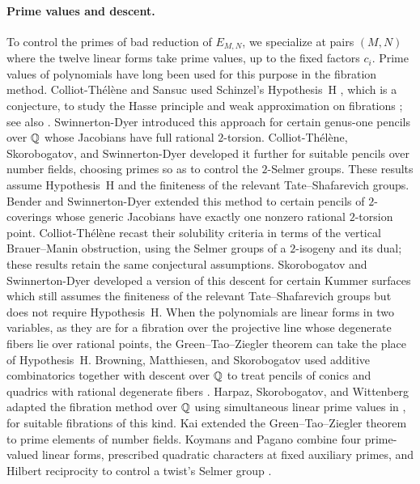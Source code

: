\paragraph{Prime values and descent.} To control the primes of bad reduction of $E_{M,N}$, we specialize at pairs $(M,N)$ where the twelve linear forms take prime values, up to the fixed factors $c_i$. Prime values of polynomials have long been used for this purpose in the fibration method. Colliot-Th\'el\`ene and Sansuc used Schinzel's Hypothesis~H \cite{SchinzelSierpinski1958}, which is a conjecture, to study the Hasse principle and weak approximation on fibrations \cite{ColliotTheleneSansuc1982}; see also \cite{ColliotTheleneSwinnertonDyer1994}. Swinnerton-Dyer \cite{SwinnertonDyer1995} introduced this approach for certain genus-one pencils over $\mathbb Q$ whose Jacobians have full rational $2$-torsion. Colliot-Th\'el\`ene, Skorobogatov, and Swinnerton-Dyer \cite[Introduction]{CSS1998GenusOne} developed it further for suitable pencils over number fields, choosing primes so as to control the $2$-Selmer groups. These results assume Hypothesis~H and the finiteness of the relevant Tate--Shafarevich groups. Bender and Swinnerton-Dyer \cite[Theorems~1--2]{BenderSwinnertonDyer2001} extended this method to certain pencils of $2$-coverings whose generic Jacobians have exactly one nonzero rational $2$-torsion point. Colliot-Th\'el\`ene \cite[Theorems~A--B and \S1.4]{ColliotThelene2001} recast their solubility criteria in terms of the vertical Brauer--Manin obstruction, using the Selmer groups of a $2$-isogeny and its dual; these results retain the same conjectural assumptions. Skorobogatov and Swinnerton-Dyer \cite{SkorobogatovSwinnertonDyer2005} developed a version of this descent for certain Kummer surfaces which still assumes the finiteness of the relevant Tate--Shafarevich groups but does not require Hypothesis~H. When the polynomials are linear forms in two variables, as they are for a fibration over the projective line whose degenerate fibers lie over rational points, the Green--Tao--Ziegler theorem can take the place of Hypothesis~H. Browning, Matthiesen, and Skorobogatov used additive combinatorics together with descent over $\mathbb Q$ to treat pencils of conics and quadrics with rational degenerate fibers \cite[Theorems~1.1--1.2]{BrowningMatthiesenSkorobogatov2014}. Harpaz, Skorobogatov, and Wittenberg adapted the fibration method over $\mathbb Q$ using simultaneous linear prime values in \cite{HSW2014}, for suitable fibrations of this kind. Kai \cite{Kai} extended the Green--Tao--Ziegler theorem to prime elements of number fields. Koymans and Pagano combine four prime-valued linear forms, prescribed quadratic characters at fixed auxiliary primes, and Hilbert reciprocity to control a twist's Selmer group \cite[\S3, Theorems~3.3 and~3.5]{KoymansPagano2025}.

